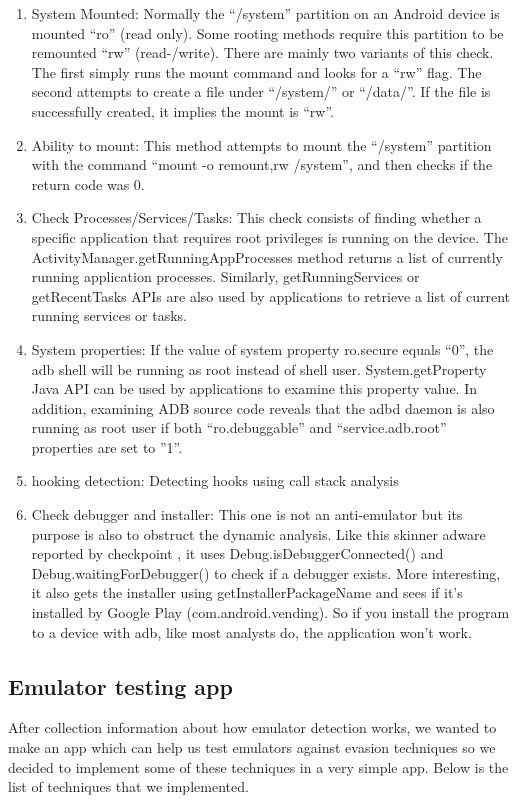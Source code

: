 \documentclass[../main.tex]{subfile}
\begin{document}
\begin{enumerate}
	\item System Mounted: Normally the “/system” partition on an Android device is mounted “ro” (read only). Some rooting methods require this partition to be remounted “rw” (read-/write). There are mainly two variants of this check. The first simply runs the mount command and looks for a “rw” flag. The second attempts to create a file under “/system/” or “/data/”. If the file is successfully created, it implies the mount is “rw”.
	\item Ability to mount: This method attempts to mount the “/system” partition with the command “mount -o remount,rw /system”, and then checks if the return code was 0.
	\item Check Processes/Services/Tasks: This check consists of finding whether a specific application that requires root privileges is running on the device. The ActivityManager.getRunningAppProcesses method returns a list of currently running application processes. Similarly, getRunningServices or getRecentTasks APIs are also used by applications to retrieve a list of current running services or tasks.
	\item System properties: If the value of system property ro.secure equals “0”, the adb shell will be running as root instead of shell user. System.getProperty Java API can be used by applications to examine this property value. In addition, examining ADB source code reveals that the adbd daemon is also running as root user if both “ro.debuggable” and “service.adb.root” properties are set to ”1”.\cite{sophos_anti_emulation} \cite{vidas2014evading}
	\item hooking detection: Detecting hooks using call stack analysis \cite{lim2016android}
	\item Check debugger and installer: This one is not an anti-emulator but its purpose is also to obstruct the dynamic analysis. Like this skinner adware reported by checkpoint \cite{skinner_adware}, it uses Debug.isDebuggerConnected() and Debug.waitingForDebugger() to check if a debugger exists. More interesting, it also gets the installer using getInstallerPackageName and sees if it’s installed by Google Play (com.android.vending). So if you install the program to a device with adb, like most analysts do, the application won’t work.\cite{sophos_anti_emulation}
	
	
	\end{enumerate}
	\subsection{Emulator testing app}\label{sec::emulator_testor}
	After collection information about how emulator detection works, we wanted to make an app which can help us test emulators against evasion techniques so we decided to implement some of these techniques in a very simple app. Below is the list of techniques that we implemented. 
	
\end{document}
